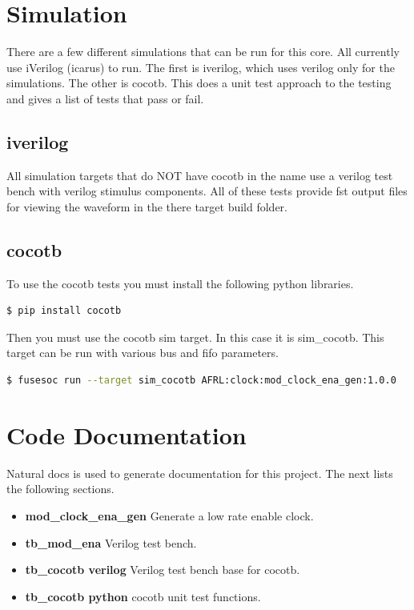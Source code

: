\newpage

\section{Simulation}
\par
There are a few different simulations that can be run for this core. All currently use iVerilog (icarus) to run. The first is iverilog, which
uses verilog only for the simulations. The other is cocotb. This does a unit test approach to the testing and gives a list of tests that pass
or fail.

\subsection{iverilog}
\par
All simulation targets that do NOT have cocotb in the name use a verilog test bench with verilog stimulus components.
All of these tests provide fst output files for viewing the waveform in the there target build folder.

\subsection{cocotb}
\par

To use the cocotb tests you must install the following python libraries.

\begin{lstlisting}[language=bash]
 $ pip install cocotb
\end{lstlisting}

Then you must use the cocotb sim target. In this case it is sim\_cocotb. This target can be run with various bus and fifo parameters.

\begin{lstlisting}[language=bash]
  $ fusesoc run --target sim_cocotb AFRL:clock:mod_clock_ena_gen:1.0.0
\end{lstlisting}

\newpage

\section{Code Documentation} \label{Code Documentation}

\par
Natural docs is used to generate documentation for this project. The next lists the following sections.

\begin{itemize}
\item \textbf{mod\_clock\_ena\_gen} Generate a low rate enable clock.\\
\item \textbf{tb\_mod\_ena} Verilog test bench.\\
\item \textbf{tb\_cocotb verilog} Verilog test bench base for cocotb.\\
\item \textbf{tb\_cocotb python} cocotb unit test functions.\\
\end{itemize}

